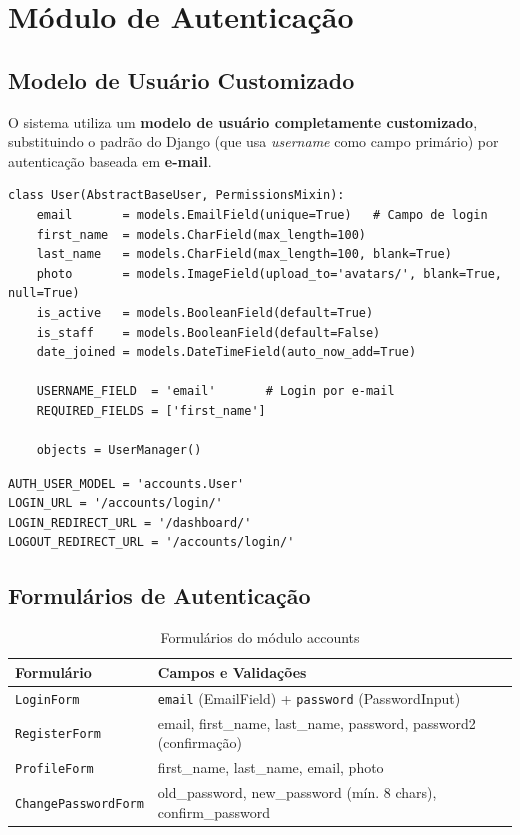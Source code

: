 \documentclass[12pt, a4paper, oneside]{report}
\begin{document}
\chapter{Módulo de Autenticação}

\section{Modelo de Usuário Customizado}

O sistema utiliza um \textbf{modelo de usuário completamente customizado}, substituindo o padrão do Django (que usa \textit{username} como campo primário) por autenticação baseada em \textbf{e-mail}.

\begin{lstlisting}[style=django, caption={accounts/models.py — Modelo User customizado}]
class User(AbstractBaseUser, PermissionsMixin):
    email       = models.EmailField(unique=True)   # Campo de login
    first_name  = models.CharField(max_length=100)
    last_name   = models.CharField(max_length=100, blank=True)
    photo       = models.ImageField(upload_to='avatars/', blank=True, null=True)
    is_active   = models.BooleanField(default=True)
    is_staff    = models.BooleanField(default=False)
    date_joined = models.DateTimeField(auto_now_add=True)

    USERNAME_FIELD  = 'email'       # Login por e-mail
    REQUIRED_FIELDS = ['first_name']

    objects = UserManager()
\end{lstlisting}

\begin{lstlisting}[style=django, caption={settings.py — Apontando para o modelo customizado}]
AUTH_USER_MODEL = 'accounts.User'
LOGIN_URL = '/accounts/login/'
LOGIN_REDIRECT_URL = '/dashboard/'
LOGOUT_REDIRECT_URL = '/accounts/login/'
\end{lstlisting}

\section{Formulários de Autenticação}

\begin{table}[H]
\centering
\caption{Formulários do módulo accounts}
\begin{tabularx}{\textwidth}{l X}
\toprule
Formulário & Campos e Validações \\
\midrule
\texttt{LoginForm} & \texttt{email} (EmailField) + \texttt{password} (PasswordInput) \\
\texttt{RegisterForm} & email, first\_name, last\_name, password, password2 (confirmação) \\
\texttt{ProfileForm} & first\_name, last\_name, email, photo \\
\texttt{ChangePasswordForm} & old\_password, new\_password (mín. 8 chars), confirm\_password \\
\bottomrule
\end{tabularx}
\end{table}
\end{document}
